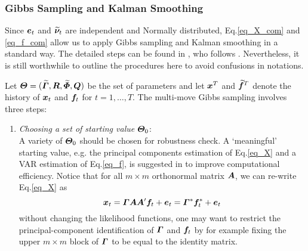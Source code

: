 \subsubsection{Gibbs Sampling and Kalman Smoothing}
Since $\bm e_t$ and $\widetilde{\bm \nu}_t$ are independent and Normally distributed, Eq.\eqref{eq_X_com} and \eqref{eq_f_com} allow us to apply Gibbs sampling and Kalman smoothing in a standard way. The detailed steps can be found in \cite{FAVAR}, who follows \cite{Gibbs}. Nevertheless, it is still worthwhile to outline the procedures here to avoid confusions in notations.

Let $\bm \varTheta=(\widetilde{\bm \varGamma},\bm R,\widetilde{\bm \varPhi},\bm Q)$ be the set of parameters and let $\bm x^T$ and $\widetilde{\bm f}^T$ denote the history of $\bm x_t$ and $\bm f_t$ for $t=1,\dots,T$. The multi-move Gibbs sampling involves three steps:
\begin{enumerate}
\item
\textit{Choosing a set of starting value $\bm \varTheta_0$}:\\
A variety of $\bm \varTheta_0$ should be chosen for robustness check. A `meaningful' starting value, e.g. the principal components estimation of Eq.\eqref{eq_X} and a VAR estimation of Eq.\eqref{eq_f}, is suggested in \cite{FAVAR} to improve computational efficiency. Notice that for all $m\times m$ orthonormal matrix $\bm A$, we can re-write Eq.\eqref{eq_X} as
\begin{equation}
	\bm x_t
		=\bm \varGamma\bm A\bm A'\bm f_t+\bm e_t
		=\bm \varGamma^*\bm f_t^*+\bm e_t
\end{equation}
without changing the likelihood functions, one may want to restrict the principal-component identification of $\bm \varGamma$ and $\bm f_t$ by for example fixing the upper $m\times m$ block of $\bm \varGamma$ to be equal to the identity matrix.


\end{enumerate}
